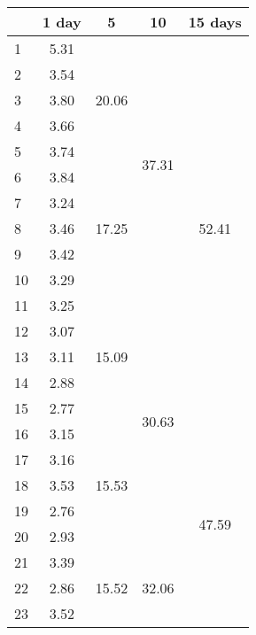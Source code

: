 \begin{center}
\begin{tabular}{| l || c | c | c | c |}\hline
 & 1 day & 5 & 10 & 15 days \\\hline
1 & \multirow{1}{*}{ 5.31 }  & \multirow{5}{*}{ 20.06 }  & \multirow{10}{*}{ 37.31 }  & \multirow{15}{*}{ 52.41 }  \\\cline{2-2}
2 & \multirow{1}{*}{ 3.54 }  & & & \\\cline{2-2}
3 & \multirow{1}{*}{ 3.80 }  & & & \\\cline{2-2}
4 & \multirow{1}{*}{ 3.66 }  & & & \\\cline{2-2}
5 & \multirow{1}{*}{ 3.74 }  & & & \\\cline{2-2}\cline{3-3}
6 & \multirow{1}{*}{ 3.84 }  & \multirow{5}{*}{ 17.25 }  & & \\\cline{2-2}
7 & \multirow{1}{*}{ 3.24 }  & & & \\\cline{2-2}
8 & \multirow{1}{*}{ 3.46 }  & & & \\\cline{2-2}
9 & \multirow{1}{*}{ 3.42 }  & & & \\\cline{2-2}
10 & \multirow{1}{*}{ 3.29 }  & & & \\\cline{2-2}\cline{3-3}\cline{4-4}
11 & \multirow{1}{*}{ 3.25 }  & \multirow{5}{*}{ 15.09 }  & \multirow{10}{*}{ 30.63 }  & \\\cline{2-2}
12 & \multirow{1}{*}{ 3.07 }  & & & \\\cline{2-2}
13 & \multirow{1}{*}{ 3.11 }  & & & \\\cline{2-2}
14 & \multirow{1}{*}{ 2.88 }  & & & \\\cline{2-2}
15 & \multirow{1}{*}{ 2.77 }  & & & \\\cline{2-2}\cline{3-3}\cline{5-5}
16 & \multirow{1}{*}{ 3.15 }  & \multirow{5}{*}{ 15.53 }  & & \multirow{15}{*}{ 47.59 }  \\\cline{2-2}
17 & \multirow{1}{*}{ 3.16 }  & & & \\\cline{2-2}
18 & \multirow{1}{*}{ 3.53 }  & & & \\\cline{2-2}
19 & \multirow{1}{*}{ 2.76 }  & & & \\\cline{2-2}
20 & \multirow{1}{*}{ 2.93 }  & & & \\\cline{2-2}\cline{3-3}\cline{4-4}
21 & \multirow{1}{*}{ 3.39 }  & \multirow{5}{*}{ 15.52 }  & \multirow{10}{*}{ 32.06 }  & \\\cline{2-2}
22 & \multirow{1}{*}{ 2.86 }  & & & \\\cline{2-2}
23 & \multirow{1}{*}{ 3.52 }  & & & \\\cline{2-2}

\end{tabular}
\end{center}
